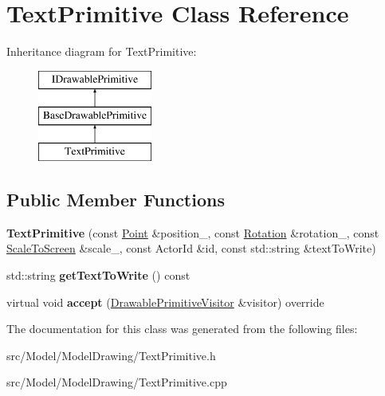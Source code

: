 \hypertarget{classTextPrimitive}{}\section{Text\+Primitive Class Reference}
\label{classTextPrimitive}
Inheritance diagram for Text\+Primitive\+:\begin{figure}[H]
\begin{center}
\leavevmode
\includegraphics[height=3.000000cm]{classTextPrimitive}
\end{center}
\end{figure}
\subsection*{Public Member Functions}
\begin{DoxyCompactItemize}
\item 
{\bfseries Text\+Primitive} (const \hyperlink{classPoint}{Point} \&position\+\_\+, const \hyperlink{classRotation}{Rotation} \&rotation\+\_\+, const \hyperlink{classScaleToScreen}{Scale\+To\+Screen} \&scale\+\_\+, const Actor\+Id \&id, const std\+::string \&text\+To\+Write)\hypertarget{classTextPrimitive_a7ecf187074bf3d4d9483e714a34eaba7}{}\label{classTextPrimitive_a7ecf187074bf3d4d9483e714a34eaba7}

\item 
std\+::string {\bfseries get\+Text\+To\+Write} () const \hypertarget{classTextPrimitive_ae1ce8139c025e52c04d755934437d77a}{}\label{classTextPrimitive_ae1ce8139c025e52c04d755934437d77a}

\item 
virtual void {\bfseries accept} (\hyperlink{classDrawablePrimitiveVisitor}{Drawable\+Primitive\+Visitor} \&visitor) override\hypertarget{classTextPrimitive_a0355dfbdd99a671fa6c647073d5b037d}{}\label{classTextPrimitive_a0355dfbdd99a671fa6c647073d5b037d}

\end{DoxyCompactItemize}


The documentation for this class was generated from the following files\+:\begin{DoxyCompactItemize}
\item 
src/\+Model/\+Model\+Drawing/Text\+Primitive.\+h\item 
src/\+Model/\+Model\+Drawing/Text\+Primitive.\+cpp\end{DoxyCompactItemize}

